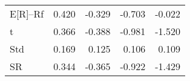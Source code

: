 \begin{tabular}{lrrrr}
\toprule
\midrule
E[R]--Rf & 0.420 & -0.329 & -0.703 & -0.022 \\
t & 0.366 & -0.388 & -0.981 & -1.520 \\
Std & 0.169 & 0.125 & 0.106 & 0.109 \\
SR & 0.344 & -0.365 & -0.922 & -1.429 \\
\bottomrule
\end{tabular}
